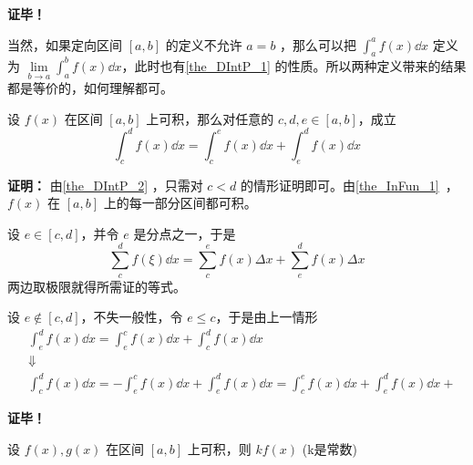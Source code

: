 \textbf{证毕！} 

当然，如果定向区间 $[a,b]$ 的定义不允许 $a=b$ ，那么可以把 $\int_a^a f(x)\dd x$ 定义为 $\lim\limits_{b\rightarrow a}\int_a^b f(x)\dd x$，此时也有\autoref{the_DIntP_1} 的性质。所以两种定义带来的结果都是等价的，如何理解都可。

\begin{theorem}{}
设 $f(x)$ 在区间 $[a,b]$ 上可积，那么对任意的 $c,d,e\in[a,b]$，成立
\begin{equation}
\int_c^d f(x)\dd x=\int_c^e f(x)\dd x+\int_e^d f(x)\dd x
\end{equation}
\end{theorem}
\textbf{证明：}
由\autoref{the_DIntP_2} ，只需对 $c<d$ 的情形证明即可。由\autoref{the_InFun_1}~，$f(x)$ 在 $[a,b]$ 上的每一部分区间都可积。

设 $e\in [c,d]$，并令 $e$ 是分点之一，于是
\begin{equation}
\sum_{c}^d f(\xi)\dd x=\sum_c^e f(x)\Delta x+\sum_e^d f(x)\Delta x
\end{equation}
两边取极限就得所需证的等式。

设 $e\notin[c,d]$，不失一般性，令 $e\leq c$，于是由上一情形
\begin{equation}
\begin{aligned}
&\int_e^d f(x)\dd x=\int_e^c f(x)\dd x+\int_c^d f(x)\dd x\\
&\Downarrow\\
&\int_c^d f(x)\dd x=-\int_e^c f(x)\dd x+\int_e^d f(x)\dd x=\int_c^e f(x)\dd x+\int_e^d f(x)\dd x+
\end{aligned}
\end{equation}

\textbf{证毕！}

\begin{theorem}{}
设 $f(x),g(x)$ 在区间 $[a,b]$ 上可积，则
\bem
 $kf(x)$ (k是常数)
\end{theorem}